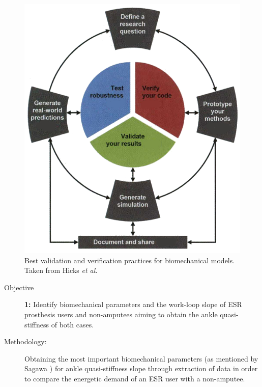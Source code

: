 \documentclass[12pt,english]{article}
\begin{document}
\begin{figure}[ht]
\begin{centering}
\includegraphics[scale=0.4]{HicksMethod}
\par\end{centering}

\caption{\label{fig:Proceso-validaci=0000F3n-y}Best validation and verification practices for biomechanical models. Taken from Hicks \emph{et al.} \cite{Hicks2014}}
\end{figure}
\begin{description}
\item [{Objective}]  \textbf{1:} Identify biomechanical parameters and the work-loop slope of ESR prosthesis users and non-amputees aiming to obtain the ankle quasi-stiffness of both cases.
\item [{Methodology:}] Obtaining the most important biomechanical parameters (as mentioned by Sagawa \cite{Sagawa2011}) for ankle quasi-stiffness slope  through extraction of data in order to compare the energetic demand of an ESR user with a non-amputee.
\end{description}
\end{document}
